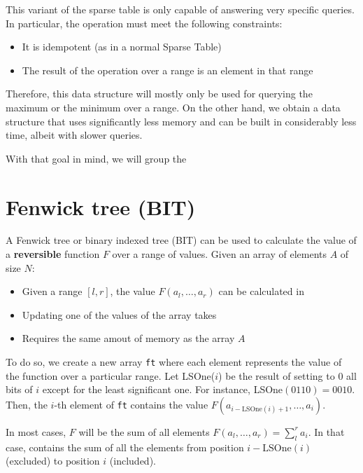 This variant of the sparse table is only capable of answering very
specific queries. In particular, the operation must meet the following
constraints:
\begin{itemize}
		\setlength{\itemsep}{2pt}
		\item It is idempotent (as in a normal Sparse Table)
		\item The result of the operation over a range is an element
				in that range
\end{itemize}
Therefore, this data structure will mostly only be used for querying the
maximum or the minimum over a range. On the other hand, we obtain a data 
structure that uses significantly less memory and can be built in
considerably less time, albeit with slower queries.

With that goal in mind, we will group the 


\begin{figure}[h!]
		\centering
\end{figure}

\newpage
\section{Fenwick tree (BIT)}
A Fenwick tree or binary indexed tree (BIT) can be used to calculate the value
of a \textbf{reversible} function $F$ over a range of values. Given an array of elements
$A$ of size $N$:
\begin{itemize}
		\setlength{\itemsep}{2pt}
		\item Given a range $[l,r]$, the value $F(a_l,\dots, a_r)$ can be calculated
				in 
		\item Updating one of the values of the array takes 
		\item Requires the same amout of memory as the array $A$
\end{itemize}
To do so, we create a new array \texttt{ft} where each element represents
the value of the function over a particular range. Let LSOne($i$) be the 
result of setting to 0 all bits of $i$ except for the least significant one.
For instance, LSOne$(0110)=0010$. Then, the $i$-th element of \texttt{ft} 
contains the value $F(a_{i-\text{LSOne}(i)+1},\dots, a_{i})$. 

In most cases, $F$ will be the sum of all elements $F(a_l,\dots, a_r)=\sum_l^r{a_i}$.
In that case,  contains the sum of all the elements from 
position $i-\text{LSOne}(i)$ (excluded) to position $i$ (included).


